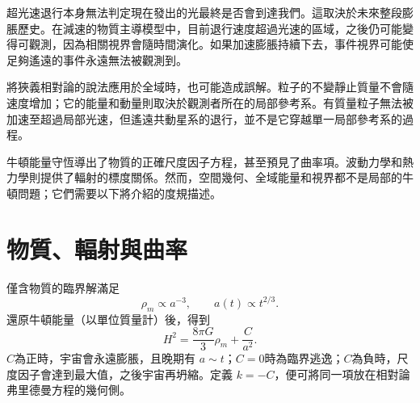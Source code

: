 超光速退行本身無法判定現在發出的光最終是否會到達我們。這取決於未來整段膨脹歷史。在減速的物質主導模型中，目前退行速度超過光速的區域，之後仍可能變得可觀測，因為相關視界會隨時間演化。如果加速膨脹持續下去，事件視界可能使足夠遙遠的事件永遠無法被觀測到。

\begin{classroomqa}
\end{classroomqa}

將狹義相對論的說法應用於全域時，也可能造成誤解。粒子的不變靜止質量不會隨速度增加；它的能量和動量則取決於觀測者所在的局部參考系。有質量粒子無法被加速至超過局部光速，但遙遠共動星系的退行，並不是它穿越單一局部參考系的過程。

\begin{classroomqa}
\end{classroomqa}

\begin{classroomqa}
\end{classroomqa}

牛頓能量守恆導出了物質的正確尺度因子方程，甚至預見了曲率項。波動力學和熱力學則提供了輻射的標度關係。然而，空間幾何、全域能量和視界都不是局部的牛頓問題；它們需要以下將介紹的度規描述。

\section{物質、輻射與曲率}

僅含物質的臨界解滿足
\begin{equation}
\rho_m\propto a^{-3},
\qquad
a(t)\propto t^{2/3}.
\end{equation}
還原牛頓能量（以單位質量計）後，得到
\begin{equation}
H^2=\frac{8\pi G}{3}\rho_m+\frac{C}{a^2}.
\end{equation}
\(C\)為正時，宇宙會永遠膨脹，且晚期有 \(a\sim t\)；\(C=0\)時為臨界逃逸；\(C\)為負時，尺度因子會達到最大值，之後宇宙再坍縮。定義 \(k=-C\)，便可將同一項放在相對論弗里德曼方程的幾何側。

